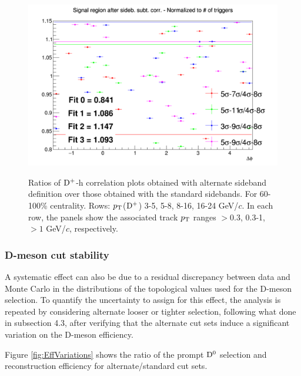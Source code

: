 \begin{figure}
{\includegraphics[width=0.31\linewidth]{Centrality_DPlus/Dplus/Systematic/60_100/Side_band_60_100/Ratio_AzimCorrDistr_Dplus_Canvas_PtIntBins11to11_PoolInt_thr1dotto99dot.png}} \\
 \caption{Ratios of ${\rm D^+}$-h correlation plots obtained with alternate sideband definition over those obtained with the standard sidebands. For 60-100\% centrality. Rows: $p_{\rm T}$(${\rm D^+}$) 3-5, 5-8, 8-16, 16-24 GeV/$c$. In each row, the panels show the associated track $p_{\rm T}$ ranges $> 0.3$, 0.3-1, $> 1$ GeV/$c$, respectively.}
\label{fig:SysBkg60100_Dplus}
\end{figure}
\clearpage

\subsubsection{D-meson cut stability}
A systematic effect can also be due to a residual discrepancy between data and Monte Carlo in the distributions of the topological values used for the D-meson selection. To quantify the uncertainty to assign for this effect, the analysis is repeated by considering alternate looser or tighter selection, following what done in subsection 4.3, after verifying that the alternate cut sets induce a significant variation on the D-meson efficiency.

Figure \ref{fig:EffVariations} shows the ratio of the prompt ${\rm D^0}$ selection and reconstruction efficiency for alternate/standard cut sets.

